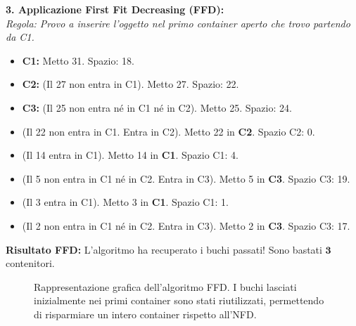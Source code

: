 \documentclass[12pt, a4paper]{article}
\begin{document}
	\vspace{0.2cm}
	\textbf{3. Applicazione First Fit Decreasing (FFD):}\\
	\textit{Regola: Provo a inserire l'oggetto nel primo container aperto che trovo partendo da C1.}
	\begin{itemize}[label=$\circ$, itemsep=1pt, leftmargin=1.5cm]
		\item \textbf{C1:} Metto 31. Spazio: 18. 
		\item \textbf{C2:} (Il 27 non entra in C1). Metto 27. Spazio: 22.
		\item \textbf{C3:} (Il 25 non entra né in C1 né in C2). Metto 25. Spazio: 24.
		\item (Il 22 non entra in C1. Entra in C2). Metto 22 in \textbf{C2}. Spazio C2: 0.
		\item (Il 14 entra in C1). Metto 14 in \textbf{C1}. Spazio C1: 4.
		\item (Il 5 non entra in C1 né in C2. Entra in C3). Metto 5 in \textbf{C3}. Spazio C3: 19.
		\item (Il 3 entra in C1). Metto 3 in \textbf{C1}. Spazio C1: 1.
		\item (Il 2 non entra in C1 né in C2. Entra in C3). Metto 2 in \textbf{C3}. Spazio C3: 17.
	\end{itemize}
	\textbf{Risultato FFD:} L'algoritmo ha recuperato i buchi passati! Sono bastati $\mathbf{3}$ contenitori.
	
	\begin{figure}[H]
		\centering
		\caption{Rappresentazione grafica dell'algoritmo FFD. I buchi lasciati inizialmente nei primi container sono stati riutilizzati, permettendo di risparmiare un intero container rispetto all'NFD.}
	\end{figure}
	
\end{document}
